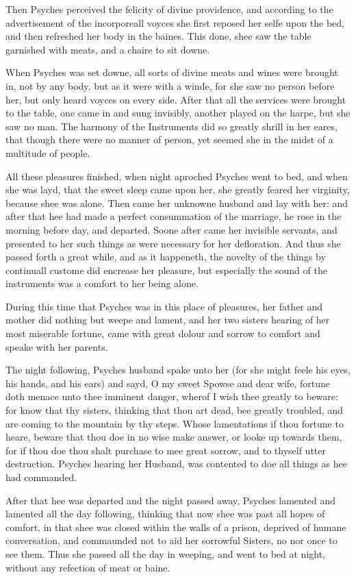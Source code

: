 Then Psyches perceived the felicity of divine providence, and according to the
advertisement of the incorporeall voyces she first reposed her selfe upon the
bed, and then refreshed her body in the baines. This done, shee saw the table
garnished with meats, and a chaire to sit downe.

When Psyches was set downe, all sorts of divine meats and wines were brought
in, not by any body, but as it were with a winde, for she saw no person before
her, but only heard voyces on every side. After that all the services were
brought to the table, one came in and sung invisibly, another played on the
harpe, but she saw no man. The harmony of the Instruments did so greatly shrill
in her eares, that though there were no manner of person, yet seemed she in the
midst of a multitude of people.

All these pleasures finished, when night aproched Psyches went to bed, and when
she was layd, that the sweet sleep came upon her, she greatly feared her
virginity, because shee was alone. Then came her unknowne husband and lay with
her: and after that hee had made a perfect consummation of the marriage, he
rose in the morning before day, and departed. Soone after came her invisible
servants, and presented to her such things as were necessary for her
defloration. And thus she passed forth a great while, and as it happeneth, the
novelty of the things by continuall custome did encrease her pleasure, but
especially the sound of the instruments was a comfort to her being alone.

During this time that Psyches was in this place of pleasures, her father and
mother did nothing but weepe and lament, and her two sisters hearing of her
most miserable fortune, came with great dolour and sorrow to comfort and speake
with her parents.

The night following, Psyches husband spake unto her (for she might feele his
eyes, his hands, and his ears) and sayd, O my sweet Spowse and dear wife,
fortune doth menace unto thee imminent danger, wherof I wish thee greatly to
beware: for know that thy sisters, thinking that thou art dead, bee greatly
troubled, and are coming to the mountain by thy steps. Whose lamentations if
thou fortune to heare, beware that thou doe in no wise make answer, or looke up
towards them, for if thou doe thou shalt purchase to mee great sorrow, and to
thyself utter destruction. Psyches hearing her Husband, was contented to doe
all things as hee had commanded.

After that hee was departed and the night passed away, Psyches lamented and
lamented all the day following, thinking that now shee was past all hopes of
comfort, in that shee was closed within the walls of a prison, deprived of
humane conversation, and commaunded not to aid her sorrowful Sisters, no nor
once to see them. Thus she passed all the day in weeping, and went to bed at
night, without any refection of meat or baine.

